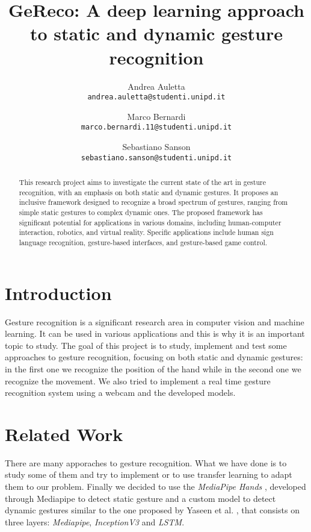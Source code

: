 \documentclass[10pt,twocolumn,letterpaper]{article}
\begin{document}
\title{GeReco: A deep learning approach to static and dynamic gesture recognition}

\author{Andrea Auletta\\
{\tt\small andrea.auletta@studenti.unipd.it}
\and
Marco Bernardi\\
{\tt\small marco.bernardi.11@studenti.unipd.it}
\and
Sebastiano Sanson\\
{\tt\small sebastiano.sanson@studenti.unipd.it}
}

\maketitle

\begin{abstract}
   This research project aims to investigate the current state of the art in gesture recognition, with an emphasis on both static and dynamic gestures. 
   It proposes an inclusive framework designed to recognize a broad spectrum of gestures, ranging from simple static gestures to complex dynamic ones. 
   The proposed framework has significant potential for applications in various domains, including human-computer interaction, robotics, and virtual reality. 
   Specific applications include human sign language recognition, gesture-based interfaces, and gesture-based game control.
\end{abstract}


\section{Introduction}
Gesture recognition is a significant research area in computer vision and machine learning. It can be used in various applications and this is why it is an important topic to study.
The goal of this project is to study, implement and test some approaches to gesture recognition, focusing on both static and dynamic gestures: in the first one we recognize the position of 
the hand while in the second one we recognize the movement. 
We also tried to implement a real time gesture recognition system using a webcam and the developed models.
\section{Related Work}
There are many apporaches to gesture recognition. What we have done is to study some of them and try to implement or to use transfer learning to adapt them to our problem.
Finally we decided to use the \textit{MediaPipe Hands} \cite{zhang2020mediapipehandsondevicerealtime}, developed through Mediapipe \cite{lugaresi2019mediapipeframeworkbuildingperception} 
to detect static gesture and a custom model to detect dynamic gestures similar to the one proposed by Yaseen et al. \cite{electronics13163233}, that consists on three layers: \textit{Mediapipe}, \textit{InceptionV3} and \textit{LSTM}.
\end{document}
